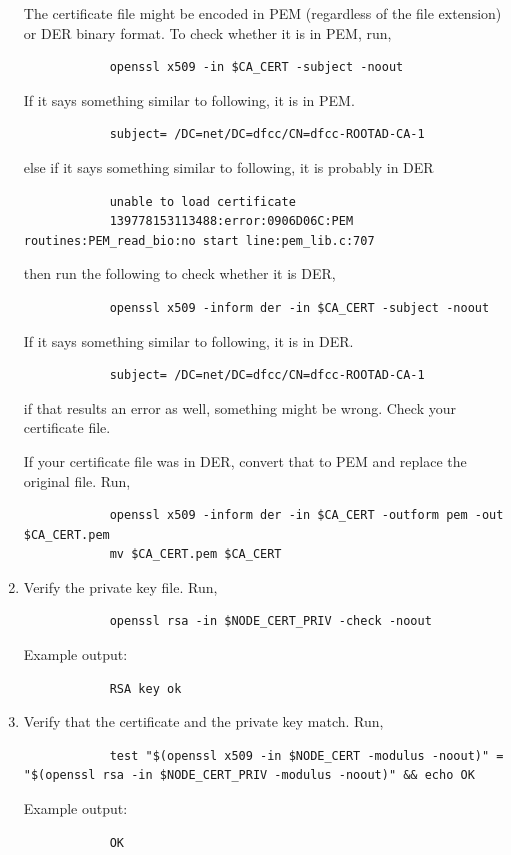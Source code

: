 \documentclass{article}
\begin{document}
\begin{enumerate}[itemsep=3ex]
        The certificate file might be encoded in PEM (regardless of the file extension) or DER binary format. To check whether it is in PEM, run,
        \begin{lstlisting}
            openssl x509 -in $CA_CERT -subject -noout
        \end{lstlisting}
        If it says something similar to following, it is in PEM.
        \begin{lstlisting}
            subject= /DC=net/DC=dfcc/CN=dfcc-ROOTAD-CA-1
        \end{lstlisting}
        else if it says something similar to following, it is probably in DER
        \begin{lstlisting}
            unable to load certificate
            139778153113488:error:0906D06C:PEM routines:PEM_read_bio:no start line:pem_lib.c:707
        \end{lstlisting}
        then run the following to check whether it is DER,
        \begin{lstlisting}
            openssl x509 -inform der -in $CA_CERT -subject -noout
        \end{lstlisting}
        If it says something similar to following, it is in DER.
        \begin{lstlisting}
            subject= /DC=net/DC=dfcc/CN=dfcc-ROOTAD-CA-1
        \end{lstlisting}
        if that results an error as well, something might be wrong. Check your certificate file.


        If your certificate file was in DER, convert that to PEM and replace the original file. Run,
        \begin{lstlisting}
            openssl x509 -inform der -in $CA_CERT -outform pem -out $CA_CERT.pem
            mv $CA_CERT.pem $CA_CERT
        \end{lstlisting}

        \item Verify the private key file. Run,
        \begin{lstlisting}
            openssl rsa -in $NODE_CERT_PRIV -check -noout
        \end{lstlisting}
        Example output:
        \begin{lstlisting}
            RSA key ok
        \end{lstlisting}

        \item Verify that the certificate and the private key match. Run,
        \begin{lstlisting}
            test "$(openssl x509 -in $NODE_CERT -modulus -noout)" = "$(openssl rsa -in $NODE_CERT_PRIV -modulus -noout)" && echo OK
        \end{lstlisting}
        Example output:
        \begin{lstlisting}
            OK
        \end{lstlisting}

    \end{enumerate}
\end{document}
